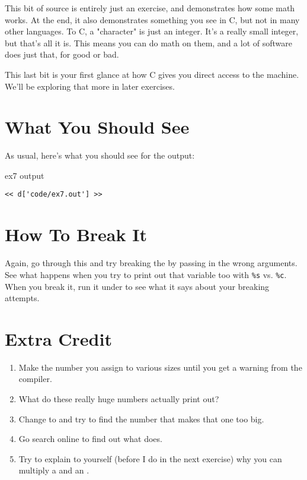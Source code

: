 This bit of source is entirely just an exercise, and demonstrates how
some math works.  At the end, it also demonstrates something you
see in C, but not in many other languages.  To C, a "character" is just an
integer.  It's a really small integer, but that's all it is.  This means
you can do math on them, and a lot of software does just that, for good
or bad.

This last bit is your first glance at how C gives you direct access to 
the machine.  We'll be exploring that more in later exercises.


\section{What You Should See}

As usual, here's what you should see for the output:

\begin{code}{ex7 output}
\begin{lstlisting}
<< d['code/ex7.out'] >>
\end{lstlisting}
\end{code}


\section{How To Break It}

Again, go through this and try breaking the  by passing in
the wrong arguments.  See what happens when you try to print out that
 variable too with \verb|%s| vs. \verb|%c|.  When you
break it, run it under  to see what it says about your
breaking attempts.

\section{Extra Credit}

\begin{enumerate}
\item Make the number you assign to  various 
    sizes until you get a warning from the compiler.
\item What do these really huge numbers actually print out?
\item Change  to  and try to find 
    the number that makes that one too big.
\item Go search online to find out what  does.
\item Try to explain to yourself (before I do in the next exercise)
    why you can multiply a  and an .
\end{enumerate}

